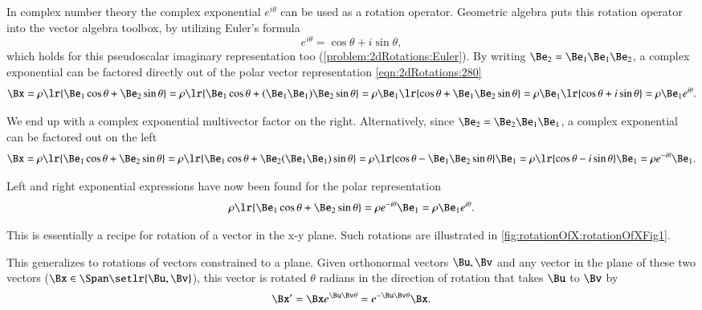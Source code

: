 In complex number theory the complex exponential \( e^{i\theta} \) can be used as a rotation operator.
Geometric algebra puts this rotation operator into the vector algebra toolbox, by utilizing
Euler's formula
\begin{dmath}\label{eqn:2dRotations:1140}
e^{i\theta} = \cos\theta + i \sin\theta,
\end{dmath}
which holds for this pseudoscalar imaginary representation too (\cref{problem:2dRotations:Euler}).
By writing \( \Be_2 = \Be_1 \Be_1 \Be_2 \),
a complex exponential can be factored directly out of the polar vector representation \cref{eqn:2dRotations:280}
\begin{dmath}\label{eqn:2dRotations:940}
\Bx
=
\rho \lr{ \Be_1 \cos\theta + \Be_2 \sin\theta }
=
\rho \lr{ \Be_1 \cos\theta + (\Be_1 \Be_1) \Be_2 \sin\theta }
=
\rho \Be_1 \lr{ \cos\theta + \Be_1 \Be_2 \sin\theta }
=
\rho \Be_1 \lr{ \cos\theta + i \sin\theta }
=
\rho \Be_1 e^{i\theta}.
\end{dmath}

We end up with a complex exponential multivector factor on the right.
Alternatively, since \( \Be_2 = \Be_2 \Be_1 \Be_1 \), a complex exponential can be factored out on the left
\begin{dmath}\label{eqn:2dRotations:960}
\Bx
=
\rho \lr{ \Be_1 \cos\theta + \Be_2 \sin\theta }
=
\rho \lr{ \Be_1 \cos\theta + \Be_2 (\Be_1 \Be_1) \sin\theta }
=
\rho \lr{ \cos\theta - \Be_1 \Be_2 \sin\theta } \Be_1
=
\rho \lr{ \cos\theta - i \sin\theta } \Be_1
=
\rho e^{-i\theta} \Be_1.
\end{dmath}

Left and right exponential expressions have now been found for the polar representation
\begin{equation}\label{eqn:2dRotations:1120}
\rho \lr{ \Be_1 \cos\theta + \Be_2 \sin\theta }
= \rho e^{-i\theta} \Be_1 = \rho \Be_1 e^{i\theta}.
\end{equation}

This is essentially a recipe for rotation of a vector in the x-y plane.
Such rotations are
illustrated in \cref{fig:rotationOfX:rotationOfXFig1}.

This generalizes to rotations of  vectors constrained to a plane.
Given orthonormal vectors \( \Bu, \Bv \) and any vector in the plane of these two vectors (\( \Bx \in \Span\setlr{\Bu,\Bv} \)), this vector is rotated \( \theta \) radians in the direction of rotation that takes \( \Bu \) to \( \Bv \) by
\begin{equation}\label{eqn:2dRotations:1160}
\Bx' = \Bx e^{ \Bu \Bv \theta } = e^{-\Bu \Bv \theta} \Bx.
\end{equation}

